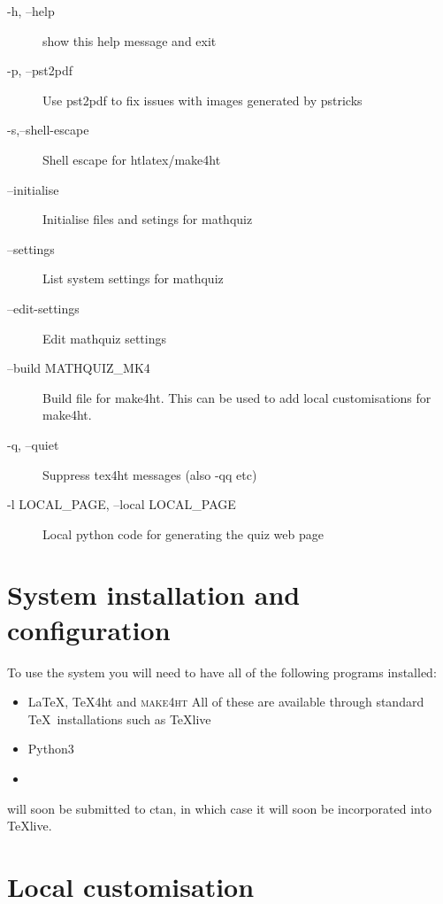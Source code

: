 \documentclass[svgnames]{article}
\begin{document}
    \begin{description}
       \item[ -h, --help]            show this help message and exit
       \item[-p, --pst2pdf]
          Use pst2pdf to fix issues with images generated by pstricks
       \item[-s,--shell-escape]
          Shell escape for htlatex/make4ht
       \item[--initialise]
          Initialise files and setings for mathquiz
       \item[--settings]
          List system settings for mathquiz
       \item[--edit-settings]
          Edit mathquiz settings
       \item[--build MATHQUIZ\_MK4]
          Build file for make4ht. This can be used to add local
          customisations for make4ht.

       \item[-q, --quiet]
          Suppress tex4ht messages (also -qq etc)
       \item[-l LOCAL\_PAGE, --local LOCAL\_PAGE]
          Local python code for generating the quiz web page
    \end{description}

\section{System installation and configuration}\label{S:installation}

    To use the system you will need to have all of the following programs installed:
    \begin{itemize}
         \item \LaTeX, \TeX 4ht and \textsc{make4ht}
         All of these are available through standard \TeX\ installations
         such as \TeX live
         \item Python3
         \item \MathQuiz
    \end{itemize}

    \MathQuiz will soon be submitted to ctan, in which case it will soon
    be incorporated into \TeX live.

\section{Local customisation}
\end{document}
